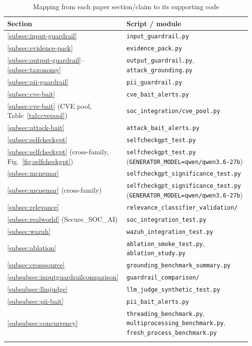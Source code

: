 \documentclass[pdflatex,sn-mathphys-num]{sn-jnl}%
\begin{document}
\begin{appendices}
\begin{table}[h]
\small
\caption{Mapping from each paper section/claim to its supporting code}\label{tab:appendixmap}
\begin{tabular}{@{}p{2.6cm}p{6.4cm}@{}}
\toprule
Section & Script / module \\
\midrule
\ref{subsec:input-guardrail} & \texttt{input\_guardrail.py} \\
\ref{subsec:evidence-pack} & \texttt{evidence\_pack.py} \\
\ref{subsec:output-guardrail}--\ref{subsec:taxonomy} & \texttt{output\_guardrail.py}, \texttt{attack\_grounding.py} \\
\ref{subsec:pii-guardrail} & \texttt{pii\_guardrail.py} \\
\ref{subsec:cve-bait} & \texttt{cve\_bait\_alerts.py} \\
\ref{subsec:cve-bait} (CVE pool, Table~\ref{tab:cvepool}) & \texttt{soc\_integration/cve\_pool.py} \\
\ref{subsec:attack-bait} & \texttt{attack\_bait\_alerts.py} \\
\ref{subsec:selfcheckgpt} & \texttt{selfcheckgpt\_test.py} \\
\ref{subsec:selfcheckgpt} (cross-family, Fig.~\ref{fig:selfcheckgpt}) & \texttt{selfcheckgpt\_test.py} (\texttt{GENERATOR\_MODEL=qwen/qwen3.6-27b}) \\
\ref{subsec:mcnemar} & \texttt{selfcheckgpt\_significance\_test.py} \\
\ref{subsec:mcnemar} (cross-family) & \texttt{selfcheckgpt\_significance\_test.py} (\texttt{GENERATOR\_MODEL=qwen/qwen3.6-27b}) \\
\ref{subsec:relevance} & \texttt{relevance\_classifier\_validation/} \\
\ref{subsec:realworld} (Secure\_SOC\_AI) & \texttt{soc\_integration\_test.py} \\
\ref{subsec:wazuh} & \texttt{wazuh\_integration\_test.py} \\
\ref{subsec:ablation} & \texttt{ablation\_smoke\_test.py}, \texttt{ablation\_study.py} \\
\ref{subsec:crosssource} & \texttt{grounding\_benchmark\_summary.py} \\
\ref{subsubsec:inputguardrailcomparison} & \texttt{guardrail\_comparison/} \\
\ref{subsubsec:llmjudge} & \texttt{llm\_judge\_synthetic\_test.py} \\
\ref{subsubsec:pii-bait} & \texttt{pii\_bait\_alerts.py} \\
\ref{subsubsec:concurrency} & \texttt{threading\_benchmark.py}, \texttt{multiprocessing\_benchmark.py}, \texttt{fresh\_process\_benchmark.py} \\
\botrule
\end{tabular}
\end{table}

\end{appendices}

\end{document}
